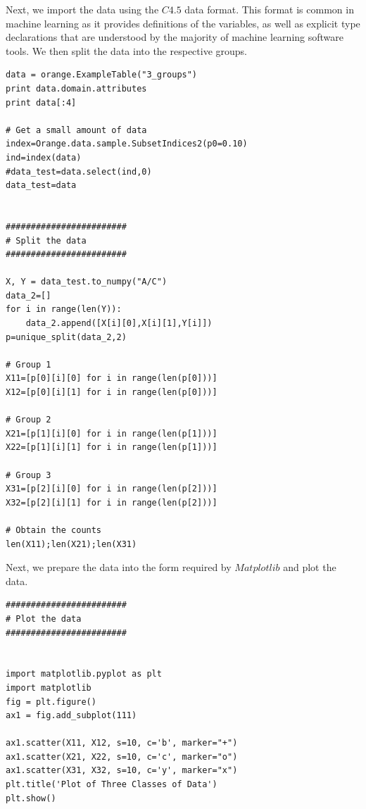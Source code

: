 \begin{flushleft}Next, we import the data using the $C4.5$ data format. This format is common in machine learning as it provides definitions of the variables, as well as explicit type declarations that are understood by the majority of machine learning software tools.  We then split the data into the respective groups.
\end{flushleft}

\begin{lstlisting}[caption={Import the Data and Split},label=2nd,firstnumber=51]
data = orange.ExampleTable("3_groups")
print data.domain.attributes
print data[:4]

# Get a small amount of data
index=Orange.data.sample.SubsetIndices2(p0=0.10)
ind=index(data)
#data_test=data.select(ind,0)
data_test=data


########################
# Split the data
########################

X, Y = data_test.to_numpy("A/C")
data_2=[]
for i in range(len(Y)):
    data_2.append([X[i][0],X[i][1],Y[i]])
p=unique_split(data_2,2)

# Group 1
X11=[p[0][i][0] for i in range(len(p[0]))]
X12=[p[0][i][1] for i in range(len(p[0]))]

# Group 2
X21=[p[1][i][0] for i in range(len(p[1]))]
X22=[p[1][i][1] for i in range(len(p[1]))]

# Group 3
X31=[p[2][i][0] for i in range(len(p[2]))]
X32=[p[2][i][1] for i in range(len(p[2]))]

# Obtain the counts
len(X11);len(X21);len(X31)

\end{lstlisting}

\begin{flushleft}Next, we prepare the data into the form required by $Matplotlib$ and plot the data.
\end{flushleft}

\begin{lstlisting}[caption={Prepare the Data for Plotting; Plot the Data},label=2nd,firstnumber=87]
########################
# Plot the data
########################


import matplotlib.pyplot as plt
import matplotlib
fig = plt.figure()
ax1 = fig.add_subplot(111)

ax1.scatter(X11, X12, s=10, c='b', marker="+")
ax1.scatter(X21, X22, s=10, c='c', marker="o")
ax1.scatter(X31, X32, s=10, c='y', marker="x")
plt.title('Plot of Three Classes of Data')
plt.show()

\end{lstlisting}

